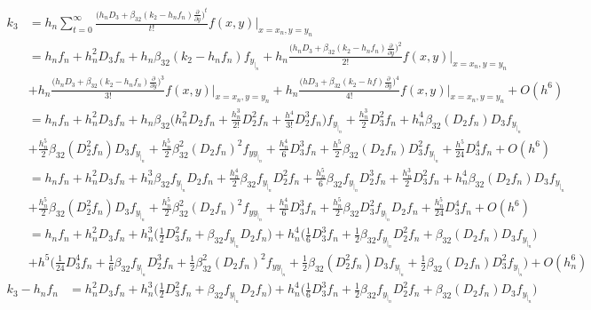 \documentclass[12 pt]{article}
\begin{document}
{
\normalsize
\begin{equation}
\begin{split}
k_{3} &= h_{n}\sum_{t=0}^{\infty}\frac{\bigg(h_{n}D_{3}+\beta_{32}(k_{2}-h_{n}f_{n})\frac{\partial}{\partial y}\bigg)^{t}}{t!}f(x,y)\bigg\vert_{x = x_{n}, y= y_{n}}\\
	  &= h_{n}f_{n} + h_{n}^{2}D_{3}f_{n} + h_{n}\beta_{32}(k_{2}-h_{n}f_{n})f_{y_{|_{n}}} + h_{n}\frac{\bigg(h_{n}D_{3}+\beta_{32}(k_{2}-h_{n}f_{n})\frac{\partial}{\partial y}\bigg)^{2}}{2!}f(x,y)\bigg\vert_{x = x_{n}, y= y_{n}} \\
	  &+ h_{n}\frac{\bigg(h_{n}D_{3}+\beta_{32}(k_{2}-h_{n}f_{n})\frac{\partial}{\partial y}\bigg)^{3}}{3!}f(x,y)\bigg\vert_{x = x_{n}, y= y_{n}}  +h_{n}\frac{\bigg(hD_{3}+\beta_{32}(k_{2}-hf)\frac{\partial}{\partial y}\bigg)^{4}}{4!}f(x,y)\bigg\vert_{x = x_{n}, y= y_{n}} + O(h^{6}) \\
	  &= h_{n}f_{n} + h_{n}^{2}D_{3}f_{n} + h_{n}\beta_{32}\bigg( h_{n}^{2}D_{2}f_{n} + \frac{h_{n}^{3}}{2!}D_{2}^{2}f_{n} + \frac{h^{4}}{3!}D_{2}^{3}f_{n}\bigg)f_{y_{|_{n}}} + \frac{h_{n}^{3}}{2}D_{3}^{2}f_{n} + h_{n}^{4}\beta_{32}(D_{2}f_{n})D_{3}f_{y_{|_{n}}} \\
	  &+ \frac{h_{n}^{5}}{2}\beta_{32}(D_{2}^{2}f_{n})D_{3}f_{y_{|_{n}}} + \frac{h_{n}^{5}}{2}\beta_{32}^{2}(D_{2}f_{n})^{2}f_{yy_{|_{n}}} + \frac{h_{n}^{4}}{6}D_{3}^{3}f_{n} + \frac{h^{5}}{2}\beta_{32}(D_{2}f_{n})D_{3}^{2}f_{y_{|_{n}}} + \frac{h^{5}}{24}D_{3}^{4}f_{n} + O(h^{6})\\
	  &= h_{n}f_{n} + h_{n}^{2}D_{3}f_{n} + h_{n}^{3}\beta_{32}f_{y_{|_{n}}}D_{2}f_{n} + \frac{h_{n}^{4}}{2}\beta_{32}f_{y_{|_{n}}}D_{2}^{2}f_{n} + \frac{h_{n}^{5}}{6}\beta_{32}f_{y_{|_{n}}}D_{2}^{3}f_{n} + \frac{h_{n}^{3}}{2}D_{3}^{2}f_{n} + h_{n}^{4}\beta_{32}(D_{2}f_{n})D_{3}f_{y_{|_{n}}}\\
	  &+ \frac{h_{n}^{5}}{2}\beta_{32}(D_{2}^{2}f_{n})D_{3}f_{y_{|_{n}}} + \frac{h_{n}^{5}}{2}\beta_{32}^{2}(D_{2}f_{n})^{2}f_{yy_{|_{n}}} + \frac{h_{n}^{4}}{6}D_{3}^{3}f_{n} + \frac{h_{n}^{5}}{2}\beta_{32}D_{3}^{2}f_{y_{|_{n}}}D_{2}f_{n} + \frac{h_{n}^{5}}{24}D_{3}^{4}f_{n} + O(h^{6})\\
	  &= h_{n}f_{n} + h_{n}^{2}D_{3}f_{n} + h_{n}^{3}\bigg(\frac{1}{2}D_{3}^{2}f_{n} + \beta_{32}f_{y_{|_{n}}}D_{2}f_{n}\bigg) + h_{n}^{4}\bigg(\frac{1}{6}D_{3}^{3}f_{n} + \frac{1}{2}\beta_{32}f_{y_{|_{n}}}D_{2}^{2}f_{n} + \beta_{32}(D_{2}f_{n})D_{3}f_{y_{|_{n}}}\bigg) \\
	  &+ h^{5}\bigg(\frac{1}{24}D^{4}_{3}f_{n} + \frac{1}{6}\beta_{32}f_{y_{|_{n}}}D_{2}^{3}f_{n} + \frac{1}{2}\beta_{32}^{2}(D_{2}f_{n})^{2}f_{yy_{|_{n}}} + \frac{1}{2}\beta_{32}(D_{2}^{2}f_{n})D_{3}f_{y_{|_{n}}} + \frac{1}{2}\beta_{32}(D_{2}f_{n})D_{3}^{2}f_{y_{|_{n}}}\bigg) + O(h_{n}^{6})
\end{split}
\end{equation}
}
\normalsize
\begin{align*}
	k_{3} - h_{n}f_{n} &= h_{n}^{2}D_{3}f_{n} + h_{n}^{3}\bigg(\frac{1}{2}D_{3}^{2}f_{n} + \beta_{32}f_{y_{|_{n}}}D_{2}f_{n}\bigg) + h_{n}^{4}\bigg(\frac{1}{6}D_{3}^{3}f_{n} + \frac{1}{2}\beta_{32}f_{y_{|_{n}}}D_{2}^{2}f_{n} + \beta_{32}(D_{2}f_{n})D_{3}f_{y_{|_{n}}}\bigg)
\end{align*}
\end{document}

